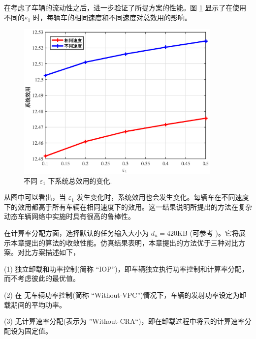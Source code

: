 在考虑了车辆的流动性之后，进一步验证了所提方案的性能。图 \ref{F6} 显示了在使用不同的$\varepsilon_1$ 时，每辆车的相同速度和不同速度对总效用的影响。
\begin{figure}[H]
\centering
\includegraphics[width=10cm]{figures//chap3//diff_e1.eps}
\caption{不同 $\varepsilon_1$ 下系统总效用的变化.}
\label{F6}
\end{figure}

从图中可以看出，当 $\varepsilon_1$ 发生变化时，系统效用也会发生变化。每辆车在不同速度下的效用都高于所有车辆在相同速度下的效用。这一结果说明所提出的方法在复杂动态车辆网络中实施时具有很高的鲁棒性。

在计算率分配方面，选择默认的任务输入大小为 $d_u=420$KB (可参考 \cite{Xu2015})。它将展示本章提出的算法的收敛性能。仿真结果表明，本章提出的方法优于三种对比方案。对比方案描述如下，

(1) 独立卸载和功率控制(简称 “IOP”)，即车辆独立执行功率控制和计算率分配，而不考虑彼此的最优值。

(2) 在  无车辆功率控制(简称 “Without-VPC”)情况下，车辆的发射功率设定为卸载期间的平均功率。

(3) 无计算速率分配(表示为 ”Without-CRA“)，即在卸载过程中将云的计算速率分配设为固定值。

